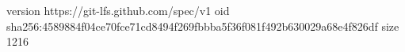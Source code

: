 version https://git-lfs.github.com/spec/v1
oid sha256:4589884f04ce70fce71cd8494f269fbbba5f36f081f492b630029a68e4f826df
size 1216

